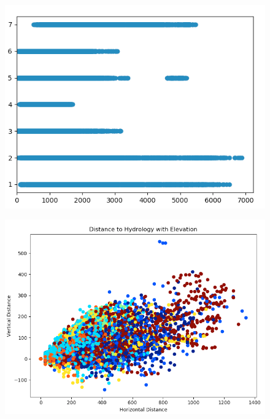 \documentclass[a4paper, 11pt]{article}
\begin{document}
\begin{figure}[htb]
\centering
\begin{minipage}{.5\textwidth}
  \centering
  \includegraphics[width=\textwidth]{img/distance_to_roads}
  \label{road}
\end{minipage}%
\begin{minipage}{.5\textwidth}
  \centering
  \includegraphics[width=1.05\textwidth]{img/hydrology_distance}
  \label{hydro}
\end{minipage}
\end{figure}
\end{document}
